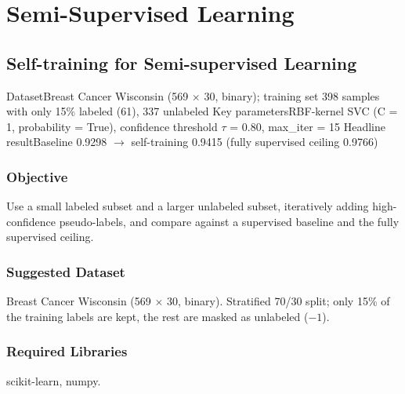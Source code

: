 
\part{Semi-Supervised Learning}

\chapter{Self-training for Semi-supervised Learning}\label{exp:07}


\quickfacts
  {Dataset}{Breast Cancer Wisconsin (569 $\times$ 30, binary); training set 398 samples with only 15\% labeled (61), 337 unlabeled}
  {Key parameters}{RBF-kernel SVC (C = 1, probability = True), confidence threshold $\tau$ = 0.80, max\_iter = 15}
  {Headline result}{Baseline 0.9298 $\rightarrow$ self-training 0.9415 (fully supervised ceiling 0.9766)}

\section{Objective}
Use a small labeled subset and a larger unlabeled subset, iteratively adding high-confidence
pseudo-labels, and compare against a supervised baseline and the fully supervised ceiling.

\section{Suggested Dataset}
Breast Cancer Wisconsin (569 $\times$ 30, binary). Stratified 70/30 split; only 15\% of the
training labels are kept, the rest are masked as unlabeled ($-1$).

\section{Required Libraries}
scikit-learn, numpy.


